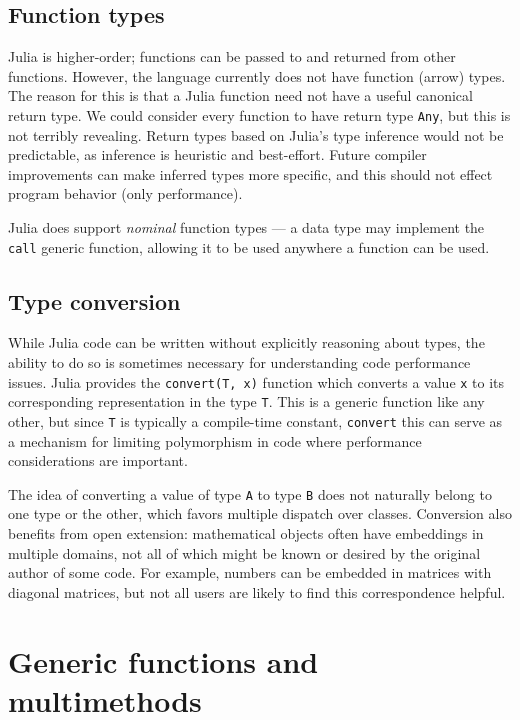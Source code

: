 \documentclass[10pt, preprint]{sigplanconf}
\begin{document}
\subsection{Function types}

Julia is higher-order; functions can be passed to and returned from other functions.
However, the language currently does not have function (arrow) types.
The reason for this is that a Julia function need not have a useful canonical return type.
We could consider every function to have return type \verb|Any|, but this is not terribly revealing.
Return types based on Julia's type inference would not be predictable, as inference is heuristic and best-effort.
Future compiler improvements can make inferred types more specific, and this should not effect program behavior (only performance).

Julia does support \emph{nominal} function types --- a data type may implement
the \verb|call| generic function, allowing it to be used anywhere a function
can be used.

\subsection{Type conversion}

While Julia code can be written without
explicitly reasoning about types, the ability to do so is sometimes necessary for
understanding code performance issues. Julia provides the \verb|convert(T, x)|
function which converts a value \verb|x| to its corresponding representation in
the type \verb|T|. This is a generic function like any other, but since
\verb|T| is typically a compile-time constant, \verb|convert| this can serve
as a mechanism for limiting polymorphism in code where performance
considerations are important.

The idea of converting a value of type \verb|A| to type \verb|B|
does not naturally belong to one type or the other, which favors multiple
dispatch over classes. Conversion also benefits from open extension:
mathematical objects often have embeddings in multiple domains, not all of
which might be known or desired by the original author of some code. For
example, numbers can be embedded in matrices with diagonal matrices, but not
all users are likely to find this correspondence helpful.


\section{Generic functions and multimethods}
\end{document}
